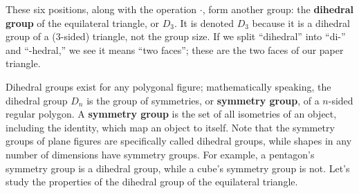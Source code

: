 \documentclass[../gatm.tex]{subfiles}
\begin{document}
These six positions, along with the operation $\cdot$, form another group: the \textbf{dihedral group} of the equilateral triangle, or $D_3$. It is denoted $D_3$ because it is a dihedral group of a ($3$-sided) triangle, not the group size. If we split ``dihedral'' into ``di-'' and ``-hedral,'' we see it means ``two faces''; these are the two faces of our paper triangle.

Dihedral groups exist for any polygonal figure; mathematically speaking, the dihedral group $D_n$ is the group of symmetries, or \textbf{symmetry group}, of a $n$-sided regular polygon. A \textbf{symmetry group} is the set of all isometries of an object, including the identity, which map an object to itself. Note that the symmetry groups of plane figures are specifically called dihedral groups, while shapes in any number of dimensions have symmetry groups. For example, a pentagon's symmetry group is a dihedral group, while a cube's symmetry group is not. Let's study the properties of the dihedral group of the equilateral triangle.

\end{document}
